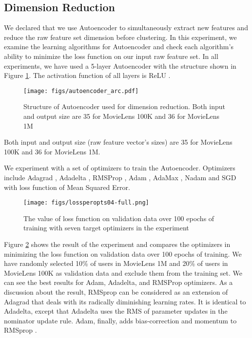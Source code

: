 \documentclass[a4paper,fleqn]{cas-dc}
\begin{document}
\subsection{Dimension Reduction}
\label{test:dr}
We declared that we use Autoencoder to simultaneously extract new features and reduce the raw feature set dimension before clustering. In this experiment, we examine the learning algorithms for Autoencoder and check each algorithm's ability to minimize the loss function on our input raw feature set. In all experiments, we have used a 5-layer Autoencoder with the structure shown in Figure \ref{FIG:08}. The activation function of all layers is ReLU \citep{62nair2010rectified}.

\begin{figure}
	\centering
	\texttt{[image: figs/autoencoder\_arc.pdf]}
	\caption{Structure of Autoencoder used for dimension reduction. Both input and output size are 35 for MovieLens 100K and 36 for MovieLens 1M}
	\label{FIG:08}
\end{figure}

Both input and output size (raw feature vector's sizes) are 35 for MovieLens 100K and 36 for MovieLens 1M.

We experiment with a set of optimizers to train the Autoencoder. Optimizers include Adagrad \citep{63duchi2011adaptive}, Adadelta \citep{64zeiler2012adadelta}, RMSProp \citep{65hinton2012neural}, Adam \citep{66kingma2014adam}, AdaMax \citep{66kingma2014adam}, Nadam \citep{67dozat2016incorporating} and SGD \citep{86bottou2008tradeoffs} with loss function of Mean Squared Error.

\begin{figure}
	\centering
	\texttt{[image: figs/lossperopts04-full.png]}
	\caption{The value of loss function on validation data over 100 epochs of training with seven target optimizers in the experiment}
	\label{FIG:09}
\end{figure}

Figure \ref{FIG:09} shows the result of the experiment and compares the optimizers in minimizing the loss function on validation data over 100 epochs of training. We have randomly selected 10\% of users in MovieLens 1M and 20\% of users in MovieLens 100K as validation data and exclude them from the training set. We can see the best results for Adam, Adadelta, and RMSProp optimizers. As a discussion about the result, RMSprop can be considered as an extension of Adagrad that deals with its radically diminishing learning rates. It is identical to Adadelta, except that Adadelta uses the RMS of parameter updates in the nominator update rule. Adam, finally, adds bias-correction and momentum to RMSprop \citep{69ruder2016overview}.
\end{document}
